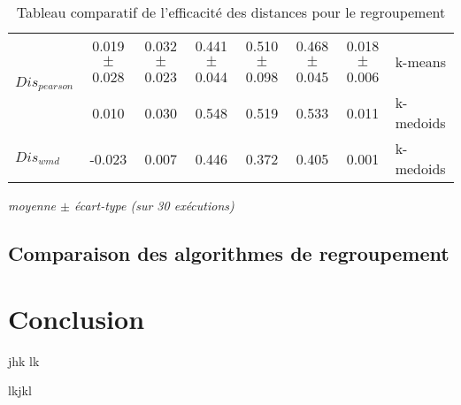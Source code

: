 \begin{table}[!htb]
\begin{tabular}{|l||c|c||c|c|c||c||l|}
		\multirow{2}{*}{$Dis_{pearson}$} & 0.019$\pm$0.028 & 0.032$\pm$0.023 & 0.441$\pm$0.044 & 0.510$\pm$0.098 & 0.468$\pm$0.045 & 0.018$\pm$0.006 & k-means \\
		& 0.010 & 0.030 & 0.548 & 0.519 & 0.533 & 0.011 & k-medoids \\ \hline
		
		
		$Dis_{wmd}$ & -0.023 & 0.007 & 0.446 & 0.372 & 0.405 & 0.001 & k-medoids \\ \hline	
		
	\end{tabular}

	\textit{moyenne $\pm$ écart-type (sur 30 exécutions)}
	\caption{Tableau comparatif de l'efficacité des distances pour le regroupement}\label{tab:similarite:compare-dist-1}
\end{table}



\subsection{Comparaison des algorithmes de regroupement}


\section{Conclusion}
\label{sec:similarite:conclusion}
jhk
lk

lkjkl